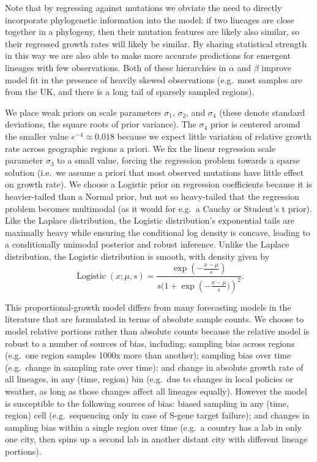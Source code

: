\documentclass[12pt]{article}
\begin{document}
Note that by regressing against mutations we obviate the need to directly incorporate phylogenetic information into the model: if two lineages are close together in a phylogeny, then their mutation features are likely also similar, so their regressed growth rates will likely be similar.
By sharing statistical strength in this way we are also able to make more accurate predictions for emergent lineages with few observations.
Both of these hierarchies in $\alpha$ and $\beta$ improve model fit in the presence of heavily skewed observations (e.g.~most samples are from the UK, and there is a long tail of sparsely sampled regions).

We place weak priors on scale parameters $\sigma_1$, $\sigma_2$, and $\sigma_4$ (these denote standard deviations, the square roots of prior variance).
The $\sigma_4$ prior is centered around the smaller value $e^{-4}\approx 0.018$ because we expect little variation of relative growth rate across geographic regions a priori.
We fix the linear regression scale parameter $\sigma_3$ to a small value, forcing the regression problem towards a sparse solution (i.e.~we assume a priori that most observed mutations have little effect on growth rate).
We choose a Logistic prior on regression coefficients because it is heavier-tailed than a Normal prior, but not so heavy-tailed that the regression problem becomes multimodal (as it would for e.g.~a Cauchy or Student's t prior).
Like the Laplace distribution, the Logistic distribution's exponential tails are maximally heavy while ensuring the conditional log density is concave, leading to a conditionally unimodal posterior and robust inference.
Unlike the Laplace distribution, the Logistic distribution is smooth, with density given by
$$
\operatorname{Logistic}(x;\mu,s) = \frac
    {\exp(-\frac{x-\mu}s)}
    {s(1 + \exp\left(-\frac{x-\mu}s)\right)^2}.
$$

This proportional-growth model differs from many forecasting models in the literature that are formulated in terms of absolute sample counts.
We choose to model relative portions rather than absolute counts because the relative model is robust to a number of sources of bias, including:
sampling bias across regions (e.g.~one region samples 1000x more than another);
sampling bias over time (e.g.~change in sampling rate over time); and
change in absolute growth rate of all lineages, in any (time, region) bin (e.g.~due to changes in local policies or weather, as long as those changes affect all lineages equally).
However the model is susceptible to the following sources of bias:
biased sampling in any (time, region) cell (e.g.~sequencing only in case of S-gene target failure); and changes in sampling bias within a single region over time (e.g.~a country has a lab in only one city, then spins up a second lab in another distant city with different lineage portions).
\end{document}
